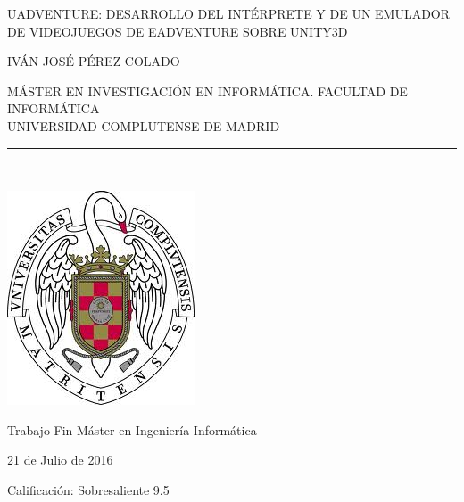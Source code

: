 \begin{center}

   \vspace{1cm}


   {\Large UADVENTURE: DESARROLLO DEL INTÉRPRETE Y DE UN EMULADOR DE VIDEOJUEGOS DE EADVENTURE SOBRE UNITY3D}\\

   \vspace{0.5cm}



   \vspace{0.5cm}



   {\large IVÁN JOSÉ PÉREZ COLADO}\\

   \vspace{0.5cm}




   MÁSTER EN INVESTIGACIÓN EN INFORMÁTICA. FACULTAD DE INFORMÁTICA\\
   UNIVERSIDAD COMPLUTENSE DE MADRID \\


   \vspace{0.65cm}
   \rule{2in}{0.5pt}\\
   \vspace{0.85cm}

  \includegraphics[height=2.5in]{figures/escudo.jpg}
  

   \vspace{0.5cm}
Trabajo Fin Máster en Ingeniería Informática

   \vspace{0.5cm}






  21 de Julio de 2016
   \vspace{1cm}
   
   Calificación: Sobresaliente 9.5
   \vspace{1cm}

\end{center}

